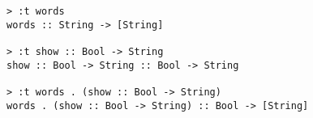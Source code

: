 \begin{repl}\begin{lstlisting}
> :t words
words :: String -> [String]

> :t show :: Bool -> String
show :: Bool -> String :: Bool -> String

> :t words . (show :: Bool -> String)
words . (show :: Bool -> String) :: Bool -> [String]\end{lstlisting}\end{repl}
